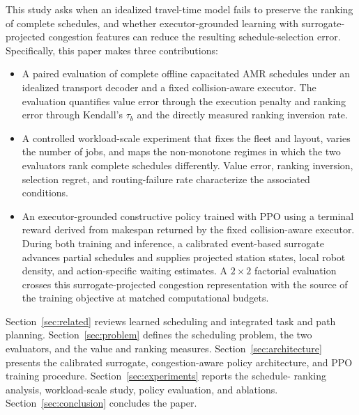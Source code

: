 This study asks when an idealized travel-time model fails to preserve the
ranking of complete schedules, and whether executor-grounded learning with
surrogate-projected congestion features can reduce the resulting
schedule-selection error.
Specifically, this paper makes three contributions:

\begin{itemize}

\item A paired evaluation of complete offline capacitated AMR schedules under
an idealized transport decoder and a fixed collision-aware executor. The
evaluation quantifies value error through the execution penalty and ranking
error through Kendall's $\tau_b$ and the directly measured ranking inversion
rate.

\item A controlled workload-scale experiment that fixes the fleet and layout,
varies the number of jobs, and maps the non-monotone regimes in which the two
evaluators rank complete schedules differently. Value error, ranking
inversion, selection regret, and routing-failure rate characterize the
associated conditions.

\item An executor-grounded constructive policy trained with PPO using a
terminal reward derived from makespan returned by the fixed collision-aware
executor. During both training and inference, a calibrated event-based
surrogate advances partial schedules and supplies projected station states,
local robot density, and action-specific waiting estimates. A $2\times2$
factorial evaluation crosses this surrogate-projected congestion representation
with the source of the training objective at matched computational budgets.

\end{itemize}

Section~\ref{sec:related} reviews learned scheduling and integrated task and
path planning. Section~\ref{sec:problem} defines the scheduling problem, the
two evaluators, and the value and ranking measures. Section~\ref{sec:architecture}
presents the calibrated surrogate, congestion-aware policy architecture, and
PPO training procedure. Section~\ref{sec:experiments} reports the schedule-
ranking analysis, workload-scale study, policy evaluation, and ablations.
Section~\ref{sec:conclusion} concludes the paper.
